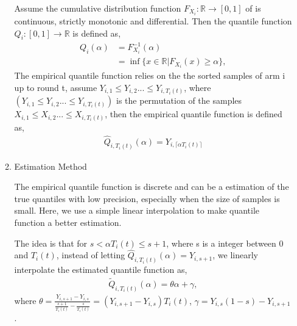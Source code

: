 \documentclass{article}
\begin{document}
\begin{enumerate}
\begin{enumerate}
    Assume the cumulative distribution function $F_{X_i}: \mathbb{R} \rightarrow [0,1]$ of  is continuous, strictly monotonic and differential. Then the quantile function $Q_{i}:  [0,1]\rightarrow \mathbb{R}$ is defined as,
\begin{align}
    Q_{i}(\alpha) &= F_{X_i}^{-1}(\alpha)\\
    &= \inf \{x \in \mathbb{R}| F_{X_i}(x) \geq \alpha\},
\end{align}
The empirical quantile function relies on the the sorted samples of arm i up to round t, assume $Y_{i,1} \leq Y_{i,2} ... \leq Y_{i,T_i(t)}$, where $(Y_{i,1} \leq Y_{i,2} ... \leq Y_{i,T_i(t)})$ is the permutation of the samples $X_{i,1} \leq X_{i,2} ... \leq X_{i,T_i(t)}$, then the empirical quantile function is defined as,
\begin{align}
    \hat{Q}_{i, T_i(t)}(\alpha) = Y_{i,\lceil \alpha T_i(t) \rceil}
\end{align}

\item Estimation Method

The empirical quantile function is discrete and can be a estimation of the true quantiles with low precision, especially when the size of samples is small. Here, we use a simple linear interpolation to make quantile function a better estimation.
    
The idea is that for $s < \alpha T_i(t) \leq s + 1$, where s is a integer between 0 and $T_i(t)$, instead of letting  $\hat{Q}_{i, T_i(t)}(\alpha) = Y_{i, s+1}$, we linearly interpolate the estimated quantile function as,
\begin{align}
    \tilde{Q}_{i, T_i(t)}(\alpha) = \theta \alpha + \gamma,
\end{align}
where $\theta = \frac{Y_{i,s+1} - Y_{i,s}}{\frac{s+1}{T_i(t)} - \frac{s}{T_i(t)}} = (Y_{i,s+1} - Y_{i,s})T_i(t)$, $\gamma = Y_{i,s}(1-s) - Y_{i,s+1}$.


\end{enumerate}
\end{enumerate}
\end{document}
